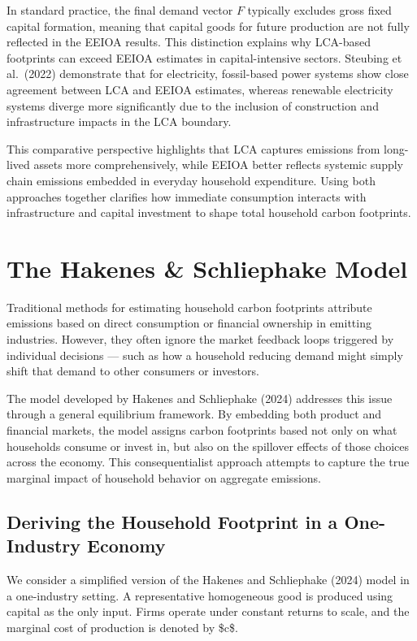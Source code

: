 \documentclass[12pt,a4paper]{article}%
\begin{document}
In standard practice, the final demand vector $F$ typically excludes gross fixed capital formation, meaning that capital goods for future production are not fully reflected in the EEIOA results. This distinction explains why LCA-based footprints can exceed EEIOA estimates in capital-intensive sectors. Steubing et al.~(2022) demonstrate that for electricity, fossil-based power systems show close agreement between LCA and EEIOA estimates, whereas renewable electricity systems diverge more significantly due to the inclusion of construction and infrastructure impacts in the LCA boundary.

This comparative perspective highlights that LCA captures emissions from long-lived assets more comprehensively, while EEIOA better reflects systemic supply chain emissions embedded in everyday household expenditure. Using both approaches together clarifies how immediate consumption interacts with infrastructure and capital investment to shape total household carbon footprints.

\section{The Hakenes \& Schliephake Model}

Traditional methods for estimating household carbon footprints attribute emissions based on direct consumption or financial ownership in emitting industries. However, they often ignore the market feedback loops triggered by individual decisions — such as how a household reducing demand might simply shift that demand to other consumers or investors.

The model developed by Hakenes and Schliephake (2024) addresses this issue through a general equilibrium framework. By embedding both product and financial markets, the model assigns carbon footprints based not only on what households consume or invest in, but also on the spillover effects of those choices across the economy. This consequentialist approach attempts to capture the true marginal impact of household behavior on aggregate emissions.

\subsection{Deriving the Household Footprint in a One-Industry Economy}

We consider a simplified version of the Hakenes and Schliephake (2024) model in a one-industry setting. A representative homogeneous good is produced using capital as the only input. Firms operate under constant returns to scale, and the marginal cost of production is denoted by \$c\$.
\end{document}
